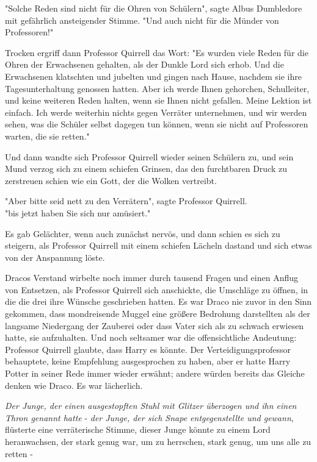 {"Solche Reden sind nicht für die Ohren von Schülern", sagte Albus Dumbledore mit gefährlich ansteigender Stimme. "Und auch nicht für die Münder von Professoren!"

Trocken ergriff dann Professor Quirrell das Wort: "Es wurden viele Reden für die Ohren der Erwachsenen gehalten, als der Dunkle Lord sich erhob. Und die Erwachsenen klatschten und jubelten und gingen nach Hause, nachdem sie ihre Tagesunterhaltung genossen hatten. Aber ich werde Ihnen gehorchen, Schulleiter, und keine weiteren Reden halten, wenn sie Ihnen nicht gefallen. Meine Lektion ist einfach. Ich werde weiterhin nichts gegen Verräter unternehmen, und wir werden sehen, was die Schüler selbst dagegen tun können, wenn sie nicht auf Professoren warten, die sie retten."

Und dann wandte sich Professor Quirrell wieder seinen Schülern zu, und sein Mund verzog sich zu einem schiefen Grinsen, das den furchtbaren Druck zu zerstreuen schien wie ein Gott, der die Wolken vertreibt.

"Aber bitte seid nett zu den Verrätern", sagte Professor Quirrell.\\ "bis jetzt haben Sie sich nur amüsiert."

Es gab Gelächter, wenn auch zunächst nervös, und dann schien es sich zu steigern, als Professor Quirrell mit einem schiefen Lächeln dastand und sich etwas von der Anspannung löste.

Dracos Verstand wirbelte noch immer durch tausend Fragen und einen Anflug von Entsetzen, als Professor Quirrell sich anschickte, die Umschläge zu öffnen, in die die drei ihre Wünsche geschrieben hatten. Es war Draco nie zuvor in den Sinn gekommen, dass mondreisende Muggel eine größere Bedrohung darstellten als der langsame Niedergang der Zauberei oder dass Vater sich als zu schwach erwiesen hatte, sie aufzuhalten. Und noch seltsamer war die offensichtliche Andeutung: Professor Quirrell glaubte, dass Harry es könnte. Der Verteidigungsprofessor behauptete, keine Empfehlung ausgesprochen zu haben, aber er hatte Harry Potter in seiner Rede immer wieder erwähnt; andere würden bereits das Gleiche denken wie Draco. Es war lächerlich.

\emph{Der Junge, der einen ausgestopften Stuhl mit Glitzer überzogen und ihn einen Thron genannt hatte} - \emph{der Junge, der sich Snape entgegenstellte und gewann}, flüsterte eine verräterische Stimme, dieser Junge könnte zu einem Lord heranwachsen, der stark genug war, um zu herrschen, stark genug, um uns alle zu retten -

}
